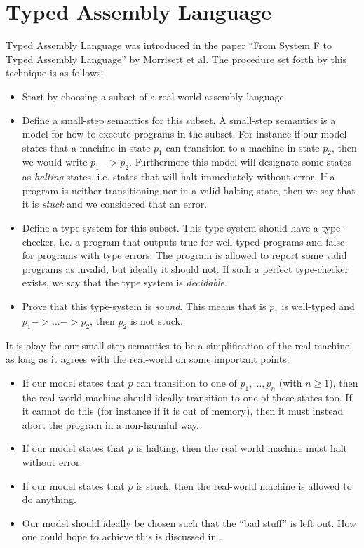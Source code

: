 \section{Typed Assembly Language}

Typed Assembly Language was introduced in the paper ``From System F to Typed
Assembly Language'' by Morrisett et al. The procedure set forth by this
technique is as follows:

\begin{itemize}
\item Start by choosing a subset of a real-world assembly language.

\item Define a small-step semantics for this subset. A small-step semantics is a
  model for how to execute programs in the subset. For instance if our model
  states that a machine in state $p_1$ can transition to a machine in state
  $p_2$, then we would write $p_1 -> p_2$. Furthermore this model will designate
  some states as \emph{halting} states, i.e. states that will halt immediately
  without error. If a program is neither transitioning nor in a valid halting
  state, then we say that it is \emph{stuck} and we considered that an error.

\item Define a type system for this subset. This type system should have a
  type-checker, i.e. a program that outputs true for well-typed programs and
  false for programs with type errors. The program is allowed to report some
  valid programs as invalid, but ideally it should not. If such a perfect
  type-checker exists, we say that the type system is \emph{decidable}.

\item Prove that this type-system is \emph{sound}. This means that is $p_1$ is
  well-typed and $p_1 -> \dots -> p_2$, then $p_2$ is not stuck.
\end{itemize}

It is okay for our small-step semantics to be a simplification of the real
machine, as long as it agrees with the real-world on some important
points:
\begin{itemize}
\item If our model states that $p$ can transition to one of $p_1, \dots, p_n$
  (with $n \geq 1$), then the real-world machine should ideally transition to
  one of these states too. If it cannot do this (for instance if it is out of
  memory), then it must instead abort the program in a non-harmful way.
\item If our model states that $p$ is halting, then the real world machine
  must halt without error.
\item If our model states that $p$ is stuck, then the real-world machine is
  allowed to do anything.
\item Our model should ideally be chosen such that the ``bad stuff'' is left
  out. How one could hope to achieve this is discussed in .
\end{itemize}

